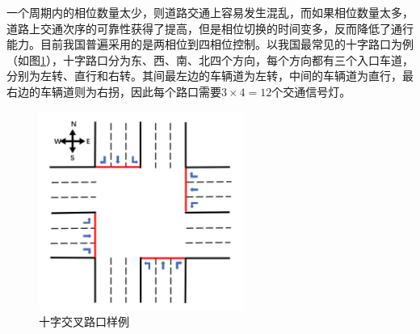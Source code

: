 
一个周期内的相位数量太少，则道路交通上容易发生混乱，而如果相位数量太多，道路上交通次序的可靠性获得了提高，但是相位切换的时间变多，反而降低了通行能力\cite{shenjiajun2014}。目前我国普遍采用的是两相位到四相位控制\cite{shuaibing}。以我国最常见的十字路口为例（如图\ref{fig:intersection_sample}），十字路口分为东、西、南、北四个方向，每个方向都有三个入口车道，分别为左转、直行和右转。其间最左边的车辆道为左转，中间的车辆道为直行，最右边的车辆道则为右拐，因此每个路口需要${3\times4=12}$个交通信号灯。


\begin{figure}[H]
	\centering
	\includegraphics[width=0.6\textwidth]{figures/intersection_sample.png}
	\caption{十字交叉路口样例}
	\label{fig:intersection_sample}
\end{figure}



